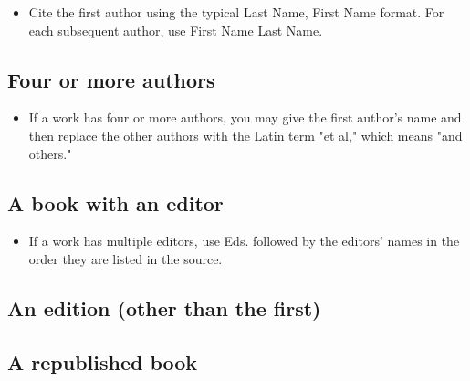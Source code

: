 
\begin{itemize}\item Cite the first author using the typical Last Name, First Name format. For each subsequent author, use First Name Last Name.\end{itemize}

\subsection{Four or more authors}



\begin{itemize}\item If a work has four or more authors, you may give the first author's name and then replace the other authors with the Latin term "et al," which means "and others." \end{itemize}

\subsection{A book with an editor}

\begin{itemize}\item If a work has multiple editors, use Eds. followed by the editors' names in the order they are listed in the source. \end{itemize}


\subsection{An edition (other than the first)}

\subsection{A republished book}


